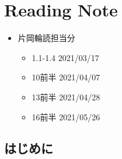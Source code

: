 \hypertarget{reading-note}{%
\section{Reading Note}\label{reading-note}}

\begin{itemize}
\tightlist
\item
  片岡輪読担当分

  \begin{itemize}
  \tightlist
  \item
    1.1-1.4 2021/03/17
  \item
    10前半 2021/04/07
  \item
    13前半 2021/04/28
  \item
    16前半 2021/05/26
  \end{itemize}
\end{itemize}

\hypertarget{ux306fux3058ux3081ux306b}{%
\subsection{はじめに}\label{ux306fux3058ux3081ux306b}}

